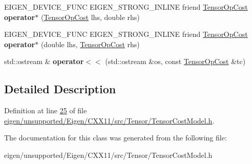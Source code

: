 \begin{DoxyCompactItemize}
\item 
\mbox{\label{class_eigen_1_1_tensor_op_cost_a7cf6f7f475447551927a5192c7d0e1d6}} 
E\+I\+G\+E\+N\+\_\+\+D\+E\+V\+I\+C\+E\+\_\+\+F\+U\+NC E\+I\+G\+E\+N\+\_\+\+S\+T\+R\+O\+N\+G\+\_\+\+I\+N\+L\+I\+NE friend \hyperlink{class_eigen_1_1_tensor_op_cost}{Tensor\+Op\+Cost} {\bfseries operator$\ast$} (\hyperlink{class_eigen_1_1_tensor_op_cost}{Tensor\+Op\+Cost} lhs, double rhs)
\item 
\mbox{\label{class_eigen_1_1_tensor_op_cost_a6557ef3f7399e2415a9602a088734438}} 
E\+I\+G\+E\+N\+\_\+\+D\+E\+V\+I\+C\+E\+\_\+\+F\+U\+NC E\+I\+G\+E\+N\+\_\+\+S\+T\+R\+O\+N\+G\+\_\+\+I\+N\+L\+I\+NE friend \hyperlink{class_eigen_1_1_tensor_op_cost}{Tensor\+Op\+Cost} {\bfseries operator$\ast$} (double lhs, \hyperlink{class_eigen_1_1_tensor_op_cost}{Tensor\+Op\+Cost} rhs)
\item 
\mbox{\label{class_eigen_1_1_tensor_op_cost_aad53c6427804f0add2236ccc87a697c8}} 
std\+::ostream \& {\bfseries operator$<$$<$} (std\+::ostream \&os, const \hyperlink{class_eigen_1_1_tensor_op_cost}{Tensor\+Op\+Cost} \&tc)
\end{DoxyCompactItemize}


\subsection{Detailed Description}


Definition at line \hyperlink{eigen_2unsupported_2_eigen_2_c_x_x11_2src_2_tensor_2_tensor_cost_model_8h_source_l00025}{25} of file \hyperlink{eigen_2unsupported_2_eigen_2_c_x_x11_2src_2_tensor_2_tensor_cost_model_8h_source}{eigen/unsupported/\+Eigen/\+C\+X\+X11/src/\+Tensor/\+Tensor\+Cost\+Model.\+h}.



The documentation for this class was generated from the following file\+:\begin{DoxyCompactItemize}
\item 
eigen/unsupported/\+Eigen/\+C\+X\+X11/src/\+Tensor/\+Tensor\+Cost\+Model.\+h\end{DoxyCompactItemize}

